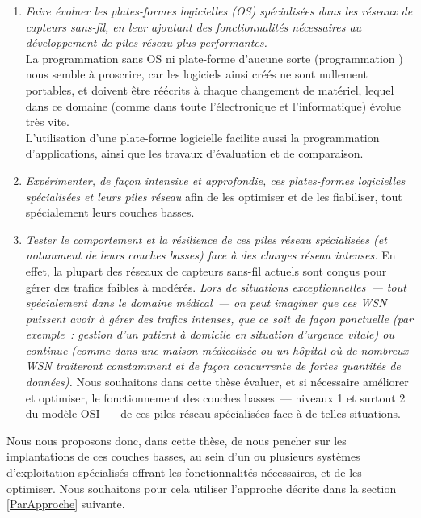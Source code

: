 \begin{enumerate}

\item \emph{Faire évoluer les plates-formes logicielles (OS) spécialisées
dans les réseaux de capteurs sans-fil, en leur ajoutant des
fonctionnalités nécessaires au développement de piles réseau plus
performantes.}\\
La programmation sans OS ni plate-forme d'aucune sorte (programmation
) nous semble à proscrire, car les logiciels ainsi
créés ne sont nullement portables, et doivent être réécrits à chaque
changement de matériel, lequel dans ce domaine (comme dans toute
l'électronique et l'informatique) évolue très vite.\\
L'utilisation d'une plate-forme logicielle facilite aussi la programmation
d'applications, ainsi que les travaux d'évaluation et de comparaison.

\item \emph{Expérimenter, de façon intensive et approfondie, ces
plates-formes logicielles spécialisées et leurs piles réseau} afin de les
optimiser et de les fiabiliser, tout spécialement leurs couches basses.

\item \emph{Tester le comportement et la résilience de ces piles réseau
spécialisées (et notamment de leurs couches basses) face à des charges
réseau intenses.} En effet, la plupart des réseaux de capteurs sans-fil
actuels sont conçus pour gérer des trafics faibles à modérés. \emph{Lors de
situations exceptionnelles~--- tout spécialement dans le domaine médical~---
on peut imaginer que ces WSN puissent avoir à gérer des trafics intenses,
que ce soit de façon ponctuelle (par exemple~: gestion d'un patient
à domicile en situation d'urgence vitale) ou continue (comme dans une
maison médicalisée ou un hôpital où de nombreux WSN traiteront constamment
et de façon concurrente de fortes quantités de données).} Nous souhaitons
dans cette thèse évaluer, et si nécessaire améliorer et optimiser,
le fonctionnement des couches basses~--- niveaux 1 et surtout 2 du modèle
OSI~--- de ces piles réseau spécialisées face à de telles situations.

\end{enumerate}

Nous nous proposons donc, dans cette thèse, de nous pencher sur les
implantations de ces couches basses, au sein d'un ou plusieurs
systèmes d'exploitation spécialisés offrant les fonctionnalités
nécessaires, et de les optimiser. Nous souhaitons pour cela utiliser
l'approche décrite dans la section \ref{ParApproche} suivante.

